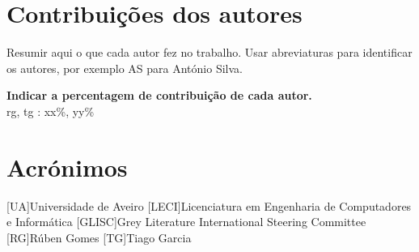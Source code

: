 \documentclass{report}
\begin{document}
\chapter*{Contribuições dos autores}
Resumir aqui o que cada autor fez no trabalho.
Usar abreviaturas para identificar os autores,
por exemplo AS para António Silva.

\vspace{10pt}
\textbf{Indicar a percentagem de contribuição de cada autor.}\\

\ac{rg}, \ac{tg} : xx\%, yy\%\\


\chapter*{Acrónimos}
\begin{acronym}
    [UA]{Universidade de Aveiro}
    [LECI]{Licenciatura em Engenharia de Computadores e Informática}
    [GLISC]{Grey Literature International Steering Committee}
    [RG]{Rúben Gomes}
    [TG]{Tiago Garcia}
\end{acronym}


\printbibliography
\end{document}
